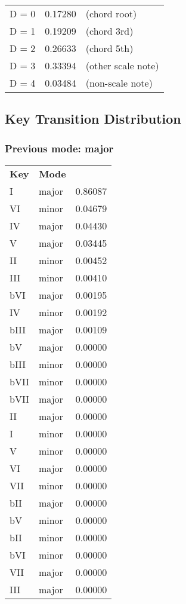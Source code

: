 \begin{tabular}{l l l}
D = 0 & 0.17280 & (chord root)\\
D = 1 & 0.19209 & (chord 3rd)\\
D = 2 & 0.26633 & (chord 5th)\\
D = 3 & 0.33394 & (other scale note)\\
D = 4 & 0.03484 & (non-scale note)\\
\end{tabular}


\subsection{Key Transition Distribution}

\subsubsection*{Previous mode: major}

\begin{tabular}{l l l}
\textbf{Key} & \textbf{Mode} \\
I & major & 0.86087 \\
VI & minor & 0.04679 \\
IV & major & 0.04430 \\
V & major & 0.03445 \\
II & minor & 0.00452 \\
III & minor & 0.00410 \\
bVI & major & 0.00195 \\
IV & minor & 0.00192 \\
bIII & major & 0.00109 \\
bV & major & 0.00000 \\
bIII & minor & 0.00000 \\
bVII & minor & 0.00000 \\
bVII & major & 0.00000 \\
II & major & 0.00000 \\
I & minor & 0.00000 \\
V & minor & 0.00000 \\
VI & major & 0.00000 \\
VII & minor & 0.00000 \\
bII & major & 0.00000 \\
bV & minor & 0.00000 \\
bII & minor & 0.00000 \\
bVI & minor & 0.00000 \\
VII & major & 0.00000 \\
III & major & 0.00000 \\
\end{tabular}

